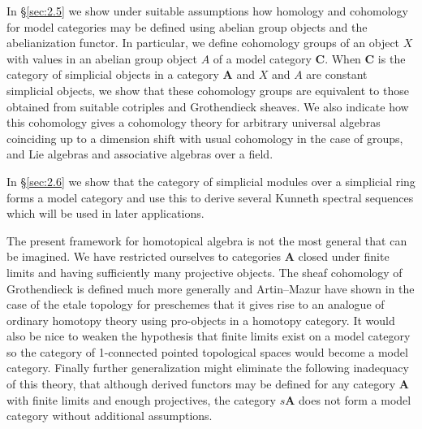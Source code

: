 \documentclass[../main]{subfiles}
\begin{document}
In \S\ref{sec:2.5} we show under suitable assumptions how homology and cohomology for model categories may be defined using abelian group objects and the abelianization functor. In particular, we define cohomology groups of an object $X$ with values in an abelian group object $A$ of a model category $\mathbf C$. When $\mathbf C$ is the category of simplicial objects in a category $\mathbf A$ and $X$ and $A$ are constant simplicial objects, we show that these cohomology groups are equivalent to those obtained from suitable cotriples and Grothendieck sheaves. We also indicate how this cohomology gives a cohomology theory for arbitrary universal algebras coinciding up to a dimension shift with usual cohomology in the case of groups, and Lie algebras and associative algebras over a field.

In \S\ref{sec:2.6} we show that the category of simplicial modules over a simplicial ring forms a model category and use this to derive several Kunneth spectral sequences which will be used in later applications.

The present framework for homotopical algebra is not the most general that can be imagined. We have restricted ourselves to categories $\mathbf A$ closed under finite limits and having sufficiently many projective objects. The sheaf cohomology of Grothendieck is defined much more generally and Artin--Mazur \cite{artin_homotopy_1967} have shown in the case of the etale topology for preschemes that it gives rise to an analogue of ordinary homotopy theory using pro-objects in a homotopy category. It would also be nice to weaken the hypothesis that finite limits exist on a model category so the category of 1-connected pointed topological spaces would become a model category. Finally further generalization might eliminate the following inadequacy of this theory, that although derived functors may be defined for any category $\mathbf A$ with finite limits and enough projectives, the category $s\mathbf A$ does not form a model category without additional assumptions.
\end{document}
